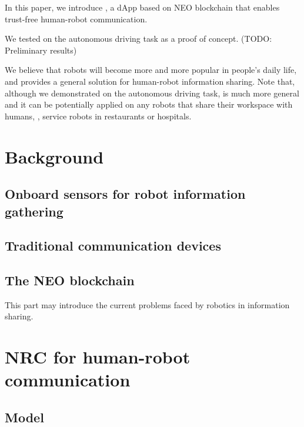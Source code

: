 \documentclass{article}
\begin{document}
In this paper, we introduce \nrc, a dApp based 
on NEO blockchain that enables trust-free human-robot 
communication.




We tested \nrc on the autonomous driving task as a proof of
concept.
(TODO: Preliminary results)


We believe that robots will become more and more popular in
people's daily life, and \nrc provides a general solution
for human-robot information sharing.
Note that, although we demonstrated \nrc on the autonomous
driving task, \nrc is much more general and it can
be potentially applied on any robots that share their workspace
with humans, \eg, service robots in restaurants or hospitals.


\section{Background}
\label{sec:background}

\subsection{Onboard sensors for robot information gathering}
\label{subsec:onboard-sensors}

\subsection{Traditional communication devices}
\label{subsec:tranditional-communication}

\subsection{The NEO blockchain}
\label{subsec:neo-blockchain}

This part may introduce the current problems faced by robotics in information sharing.

\section{NRC for human-robot communication}
\label{sec:nrc}

\subsection{Model}
\label{subsec:model}
\end{document}
